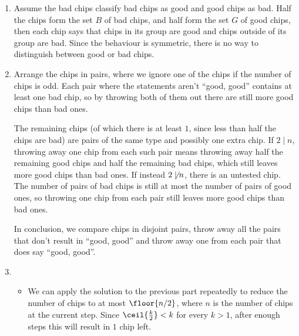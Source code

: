 \documentclass[oneside]{scrbook}
\theoremstyle{definition}
\begin{document}
\begin{problem}
\begin{enumerate}[label=\alph*.]
\item %
Assume the bad chips classify bad chips as good and good chips as bad.
Half the chips form the set $B$ of bad chips, and half form the set $G$ of good chips, then each chip says that chips in its group are good and chips outside of its group are bad. Since the behaviour is symmetric, there is no way to distinguish between good or bad chips.
\item %
Arrange the chips in pairs, where we ignore one of the chips if the number of chips is odd.
Each pair where the statements aren't ``good, good'' contains at least one bad chip, so by throwing both of them out there are still more good chips than bad ones.

The remaining chips (of which there is at least $1$, since less than half the chips are bad) are pairs of the same type and possibly one extra chip. If $2 \mid n$, throwing away one chip from each such pair means throwing away half the remaining good chips and half the remaining bad chips, which still leaves more good chips than bad ones. 
If instead $2 \not\mid n$, there is an untested chip. The number of pairs of bad chips is still at most the number of pairs of good ones, so throwing one chip from each pair still leaves more good chips than bad ones.

In conclusion, we compare chips in disjoint pairs, throw away all the pairs that don't result in ``good, good'' and throw away one from each pair that does say ``good, good''. 

\item %
\begin{itemize}
\item We can apply the solution to the previous part repeatedly to reduce the number of chips to at most $\floor{n/2}$, where $n$ is the number of chips at the current step. Since $\ceil{\frac{k}{2}} < k$ for every $k > 1$, after enough steps this will result in $1$ chip left.


\end{itemize}
\end{enumerate}
\end{problem}
\end{document}
